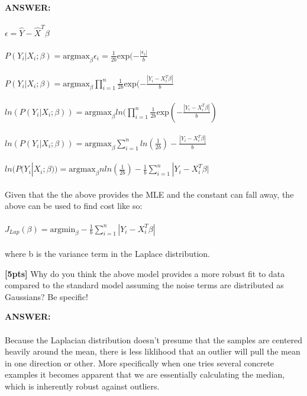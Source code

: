 \documentclass[paper=a4, fontsize=11pt]{scrartcl} %
\numberwithin{figure}{section} %
\numberwithin{table}{section} %
\begin{document}
\begin{addmargin}[2em]{2em}%
  \textbf{ANSWER:}\\\\
  $\epsilon = \hat Y - \hat X^T \beta$
  \\\\
  $P(Y_i | X_i; \beta) = \textrm{argmax}_{\beta}\epsilon_i = \frac{1}{2b} \textrm{exp}(-\frac{|\epsilon_i|}{b} $
  \\\\
  $P(Y_i | X_i; \beta) = \textrm{argmax}_{\beta} \prod_{i=1}^n \frac{1}{2b} \textrm{exp}(-\frac{|Y_i -X_i^T \beta|}{b}$
  \\\\
  $ln(P(Y_i | X_i; \beta)) = \textrm{argmax}_{\beta} ln(\prod_{i=1}^n \frac{1}{2b} \textrm{exp}(-\frac{|Y_i -X_i^T \beta|}{b})$
  \\\\
  $ln(P(Y_i | X_i; \beta)) = \textrm{argmax}_{\beta} \sum_{i=1}^n ln( \frac{1}{2b}) - \frac{|Y_i -X_i^T \beta|}{b}$
  \\\\
  $ln(P(Y_i | X_i; \beta)) = \textrm{argmax}_{\beta} nln( \frac{1}{2b}) - \frac{1}{b}\sum_{i=1}^n |Y_i -X_i^T \beta|$
  \\\\
  Given that the the above provides the MLE and the constant can fall away, the above can be used to find cost like so:
  \\\\
  $J_{Lap}(\beta)= \textrm{argmin}_{\beta} -\frac{1}{b}\sum_{i=1}^n |Y_i -X_i^T \beta|$\\\\
  where b is the variance term in the Laplace distribution.
  \\

\end{addmargin}

\textbf{[5pts]} Why do you think the above model provides a more robust fit to data compared to the standard model assuming the noise terms are distributed as Gaussians? Be specific!
\\
\begin{addmargin}[2em]{2em}
  \textbf{ANSWER:}\\\\
  Because the Laplacian distribution doesn't presume that the samples are centered heavily around the mean, there is less liklihood that an outlier will pull the mean in one direction or other. More specifically when one tries several concrete examples it becomes apparent that we are essentially calculating the median, which is inherently robust against outliers.
  \\
\end{addmargin}
\end{document}
